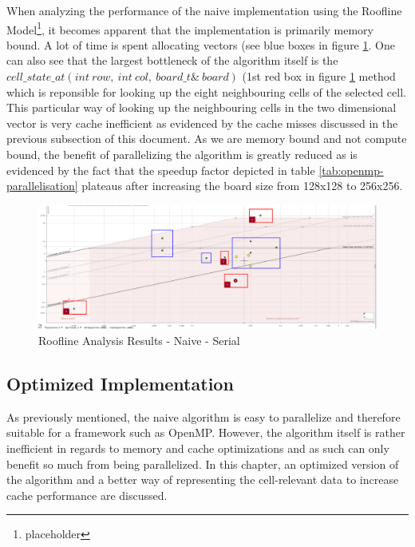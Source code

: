 \documentclass[a4paper,english,12pt,twoside=false]{scrartcl} %
\begin{document}
When analyzing the performance of the naive implementation using the Roofline Model\footnote{placeholder}, it becomes apparent that the implementation is primarily memory bound. A lot of time is spent allocating vectors (see blue boxes in figure \ref{fig:roofline-naive-32-100k}. One can also see that the largest bottleneck of the algorithm itself is the \textbf{$cell{\_}state{\_}at(int{\ }row,{\ }int{\ }col,{\ }board{\_}t{\&}{\ } board)$} (1st red box in figure \ref{fig:roofline-naive-32-100k} method which is reponsible for looking up the eight neighbouring cells of the selected cell. This particular way of looking up the neighbouring cells in the two dimensional vector is very cache inefficient as evidenced by the cache misses discussed in the previous subsection of this document. As we are memory bound and not compute bound, the benefit of parallelizing the algorithm is greatly reduced as is evidenced by the fact that the speedup factor depicted in table \ref{tab:openmp-parallelisation} plateaus after increasing the board size from 128x128 to 256x256.

\begin{figure}[tbh!]
	\centering
	\includegraphics[width=16cm]{imgs/roofline-naive-32-100k.png}
	\caption{Roofline Analysis Results - Naive - Serial}
	\label{fig:roofline-naive-32-100k}
\end{figure}

\pagebreak

\subsection{Optimized Implementation}

As previously mentioned, the naive algorithm is easy to parallelize and therefore suitable for a framework such as OpenMP. However, the algorithm itself is rather inefficient in regards to memory and cache optimizations and as such can only benefit so much from being parallelized. In this chapter, an optimized version of the algorithm and a better way of representing the cell-relevant data to increase cache performance are discussed.
\end{document}
